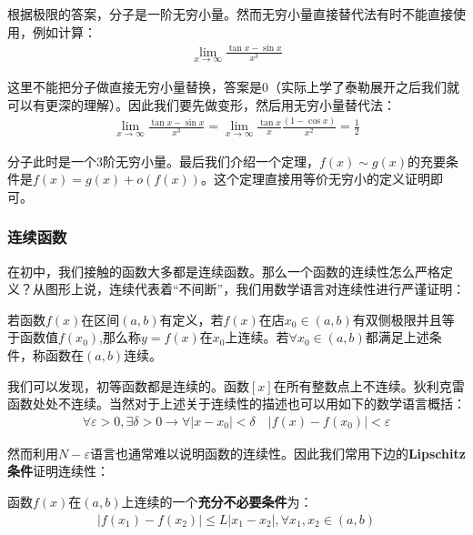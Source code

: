 \documentclass{ctexart}
\let\oldtextbf\textbf %
\renewcommand{\textbf}[1]{\textcolor{btex}{\oldtextbf{#1}}} %
\begin{document}
根据极限的答案，分子是一阶无穷小量。然而无穷小量直接替代法有时不能直接使用，例如计算：
\begin{align*}
    \lim_{x\to\infty}\frac{\tan x-\sin x}{x^3}
\end{align*}

这里不能把分子做直接无穷小量替换，答案是0（实际上学了泰勒展开之后我们就可以有更深的理解）。因此我们要先做变形，然后用无穷小量替代法：
\begin{align*}
    \lim_{x\to\infty}\frac{\tan x-\sin x}{x^3}=\lim_{x\to\infty}\frac{\tan x}{x}\frac{(1-\cos x)}{x^2}=\frac{1}{2}
\end{align*}

分子此时是一个3阶无穷小量。最后我们介绍一个定理，$f(x)\sim g(x)$的充要条件是$f(x)=g(x)+o(f(x))$。这个定理直接用等价无穷小的定义证明即可。

\subsubsection{连续函数}
在初中，我们接触的函数大多都是连续函数。那么一个函数的连续性怎么严格定义？从图形上说，连续代表着“不间断”，我们用数学语言对连续性进行严谨证明：
\begin{tcolorbox}[
    colback=bac2,     %
    colframe=fra2,   %
    coltitle=white,             %
    coltext=tex2,
    title=连续的定义,
    fonttitle=\bfseries,        %
arc=3mm,                     %
breakable
]
若函数$f(x)$在区间$(a,b)$有定义，若$f(x)$在店$x_0\in(a,b)$有双侧极限并且等于函数值$f(x_0)$,那么称$y=f(x)$在$x_0$上连续。若$\forall x_0\in(a,b)$都满足上述条件，称函数在$(a,b)$连续。
\end{tcolorbox}

我们可以发现，初等函数都是连续的。函数$[x]$在所有整数点上不连续。狄利克雷函数处处不连续。当然对于上述关于连续性的描述也可以用如下的数学语言概括：
\begin{align*}
    \forall \varepsilon>0,\exists \delta >0\to \forall |x-x_0|<\delta\quad|f(x)-f(x_0)|<\varepsilon
\end{align*}

然而利用$N-\varepsilon$语言也通常难以说明函数的连续性。因此我们常用下边的\textbf{\color{btex}Lipschitz条件}证明连续性：
\begin{tcolorbox}[
    colback=bac1,     %
    colframe=fra1,   %
    coltitle=white,             %
    coltext=tex1,
    title=Lipschitz条件,
    fonttitle=\bfseries,        %
arc=3mm,                     %
breakable
]
函数$f(x)$在$(a,b)$上连续的一个\textbf{\color{btex}充分不必要条件}为：
\begin{align*}
    |f(x_1)-f(x_2)|\leq L|x_1-x_2|,\forall x_1,x_2\in (a,b)
\end{align*}
\end{tcolorbox}
\end{document}
